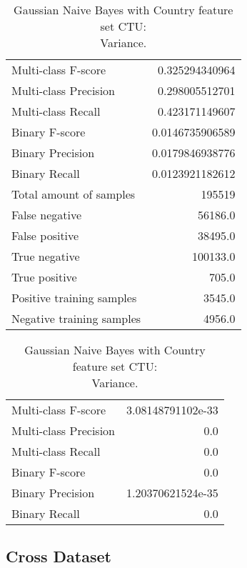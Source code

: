\begin{table}[H]
\begin{minipage}{0.5\textwidth}
\caption{Gaussian Naive Bayes with Country feature set CTU: \\Average.}
\centering
\begin{tabular}{l r}
\toprule
Multi-class F-score & 0.325294340964 \\
Multi-class Precision & 0.298005512701 \\
Multi-class Recall & 0.423171149607 \\
\midrule
Binary F-score & 0.0146735906589 \\
Binary Precision & 0.0179846938776 \\
Binary Recall & 0.0123921182612 \\
\midrule
Total amount of samples & 195519 \\
False negative & 56186.0 \\
False positive & 38495.0 \\
True negative & 100133.0 \\
True positive & 705.0 \\
\midrule
Positive training samples & 3545.0 \\
Negative training samples & 4956.0 \\
\bottomrule
\end{tabular}
\end{minipage}
\hfillx
\begin{minipage}{0.5\textwidth}
\caption{Gaussian Naive Bayes with Country feature set CTU: \\Variance.}
\centering
\begin{tabular}{l r}
\toprule
Multi-class F-score & 3.08148791102e-33 \\
Multi-class Precision & 0.0 \\
Multi-class Recall & 0.0 \\
\midrule
Binary F-score & 0.0 \\
Binary Precision & 1.20370621524e-35 \\
Binary Recall & 0.0 \\
\bottomrule
\end{tabular}
\end{minipage}
\end{table}

\newpage
\subsection{Cross Dataset}

